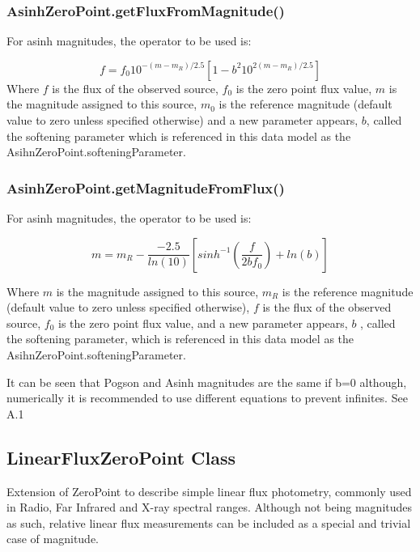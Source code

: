 \documentclass[11pt,a4paper]{ivoa}
\begin{document}

\subsubsection{AsinhZeroPoint.getFluxFromMagnitude()}
For asinh magnitudes, the operator to be used is:\par
\[
f = f_0 10^{-(m-m_R )/2.5} \left[ 1-b^2 10^{2(m-m_R )/2.5}\right] 
\]
Where $f$ is the flux of the observed source, $f_0$ is the zero point flux value, $m$ is the magnitude assigned to this source, $m_0$ is the reference magnitude (default value to zero unless specified otherwise) and a new parameter appears, $b$, called the softening parameter which is referenced in this data model as the AsihnZeroPoint.softeningParameter.
\par

\subsubsection{AsinhZeroPoint.getMagnitudeFromFlux()}
For asinh magnitudes, the operator to be used is:\par
\[
m = m_R - \frac{-2.5}{ln(10)}\left[ sinh^{-1}\left (\frac{f}{2bf_0}\right) + ln(b) \right]
\]

Where $m$ is the magnitude assigned to this source, $m_R$ is the reference magnitude (default value to zero unless specified otherwise), $f$ is the flux of the observed source, $f_0$ is the zero point flux value, and a new parameter appears, $b$ , called the softening parameter, which is referenced in this data model as the AsihnZeroPoint.softeningParameter.
\par

It can be seen that Pogson and Asinh magnitudes are the same if b=0 although, numerically it is recommended to use different equations to prevent infinites. See A.1 
\par

\subsection{LinearFluxZeroPoint Class}
Extension of ZeroPoint  to describe simple linear flux photometry, commonly used in Radio, Far Infrared and X-ray spectral ranges. Although not being magnitudes as such, relative linear flux measurements can be included as a special and trivial case of magnitude.\par
\end{document}
